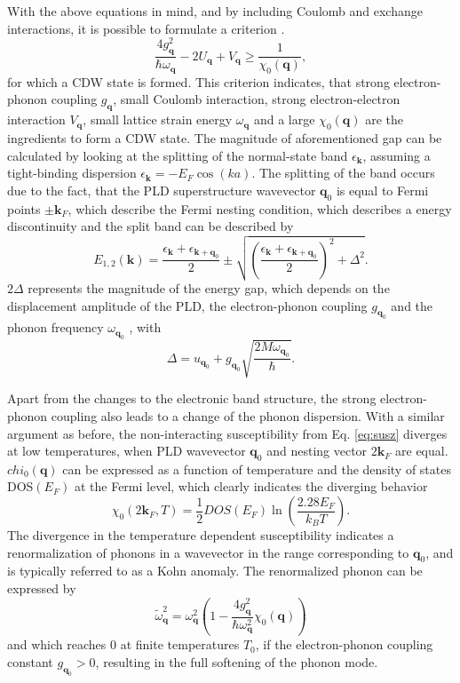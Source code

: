 With the above equations in mind, and by including Coulomb and exchange interactions, it is possible to formulate a criterion \cite{chan_spin_1973}.
\begin{equation}
	\frac{4g_\mathbf{q}^2}{\hbar\omega_\mathbf{q}}-2U_\mathbf{q}+V_\mathbf{q}\geq\frac{1}{\chi_0(\mathbf{q})},
\end{equation}
for which a CDW state is formed.
This criterion indicates, that strong electron-phonon coupling $g_\mathbf{q}$, small Coulomb interaction, strong electron-electron interaction $V_\mathbf{q}$, small lattice strain energy $\omega_\mathbf{q}$ and a large $\chi_0(\mathbf{q})$ are the ingredients to form a CDW state.
The magnitude of aforementioned gap can be calculated by looking at the splitting of the normal-state band $\epsilon_\mathbf{k}$, assuming a tight-binding dispersion $\epsilon_\mathbf{k}=-E_F\cos(ka)$.
The splitting of the band occurs due to the fact, that the PLD superstructure wavevector $\mathbf{q}_0$ is equal to Fermi points $\pm\mathbf{k}_F$, which describe the Fermi nesting condition, which describes a energy discontinuity and the split band can be described by
\begin{equation}
	E_{1,2}(\mathbf{k})=\frac{\epsilon_{\mathbf{k}}+\epsilon_{\mathbf{k}+\mathbf{q}_0}}{2}\pm\sqrt{\left( \frac{\epsilon_{\mathbf{k}}+\epsilon_{\mathbf{k}+\mathbf{q}_0}}{2}\right)^2 + \Delta^2 }.
\end{equation}
$2\Delta$ represents the magnitude of the energy gap, which depends on the displacement amplitude of the PLD, the electron-phonon coupling $g_{\mathbf{q}_0}$ and the phonon frequency $\omega_{\mathbf{q}_0}$ \cite{gruner_density_2019}, with
\begin{equation}
	\Delta=u_{\mathbf{q}_0} + g_{\mathbf{q}_0} \sqrt{\frac{2M\omega_{\mathbf{q}_0}}{\hbar}}.
\end{equation}

Apart from the changes to the electronic band structure, the strong electron-phonon coupling also leads to a change of the phonon dispersion.
With a similar argument as before, the non-interacting susceptibility from Eq. \ref{eq:susz} diverges at low temperatures, when PLD wavevector $\mathbf{q}_0$ and nesting vector $2\mathbf{k}_F$ are equal.
$chi_0(\mathbf{q})$ can be expressed as a function of temperature and the density of states DOS$(E_F)$ at the Fermi level, which clearly indicates the diverging behavior
\begin{equation}
	\chi_0 (2\mathbf{k}_F, T)=\frac{1}{2}DOS(E_F)\ln\left( \frac{2.28E_F}{k_BT}\right).
\end{equation}
The divergence in the temperature dependent susceptibility indicates a renormalization of phonons in a wavevector in the range corresponding to $\mathbf{q}_0$, and is typically referred to as a Kohn anomaly.
The renormalized phonon can be expressed by
\begin{equation}
	\widetilde{\omega}_\mathbf{q}^2 = \omega_\mathbf{q}^2 \left( 1-\frac{4g_\mathbf{q}^2}{\hbar\omega_\mathbf{q}^2} \chi_0(\mathbf{q}) \right)
	\label{eq:kohn}
\end{equation}
and which reaches $0$ at finite temperatures $T_0$, if the electron-phonon coupling constant $g_{\mathbf{q}_0}>0$, resulting in the full softening of the phonon mode.


